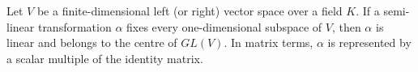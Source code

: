 Let $V$ be a finite-dimensional left (or right) vector space over a field $K$. If a semi-linear transformation $\alpha$ fixes every one-dimensional subspace of $V$, then $\alpha$ is linear and belongs to the centre of $GL(V)$. In matrix terms, $\alpha$ is represented by a scalar multiple of the identity matrix.
